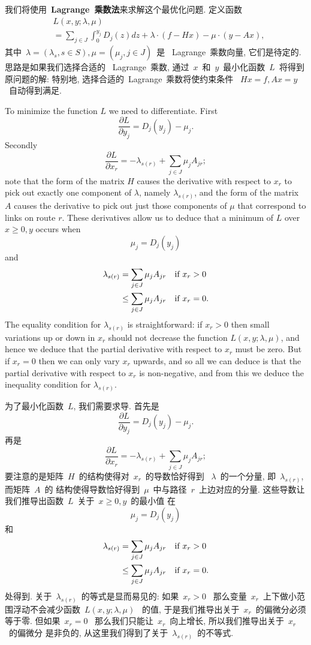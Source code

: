 \documentclass[a4paper,12pt, twocolumn]{article}
\begin{document}
我们将使用~\textbf{Lagrange~乘数法}来求解这个最优化问题. 
定义函数
\begin{align*}
&L(x ,y ;\lambda ,\mu )   \\
&=\sum_{j\in J}\int_0^{y_j} 
D_j (z)dz+\lambda \cdot (f-H x)-\mu \cdot (y -A x ),
\end{align*}
其中~$\lambda =(\lambda_s, s \in S), \mu =(\mu_j, j \in J)$~是
~Lagrange~乘数向量, 它们是待定的. 思路是如果我们选择合适的
~Lagrange~乘数, 通过~$x$~和~$y$~最小化函数~$L$~将得到
原问题的解: 特别地, 选择合适的~Lagrange~乘数将使约束条件
~$H x =f, A x =y$~自动得到满足.

To minimize the function $L$ we need to differentiate.
First 
$${\frac{\partial L}{\partial y_j}} = D _j (y_j) -\mu_j .$$
Secondly
$${\frac{\partial L}{\partial x_r}} = -\lambda_{s(r)} +\sum_{j\in J}
\mu_j A_{jr};$$
note that the form of the 
matrix $H$ causes the derivative with respect to $x_r$
to pick out exactly one component of $\lambda$, namely $\lambda_{s(r)}$,
and the form of the  matrix $A$ causes the derivative 
to pick out just those components of
$\mu$ that correspond to links on route $r$.  
These derivatives allow us to deduce that
a minimum of $L$ over $x \geq 0, y$ occurs when
$$\mu_j =D_j(y_j) $$
and
\begin{align*}
\lambda_{s(r)}&=\sum_{j\in J} \mu_j A_{jr} \quad \hbox{if $x_r >0$} \\
&\leq\sum_{j\in J} \mu_j A_{jr} \quad \hbox{if $x_r=0$}.
\end{align*}
The equality condition for $\lambda_{s(r)}$
is straightforward:  if $x_r >0$ 
then small variations up or down in $x_r$ should
not decrease the function $L(x ,y ;\lambda ,\mu)$, and hence 
we deduce that the
partial derivative with respect to $x_r$ must be zero.
But if  $x_r =0$ then we can only vary $x_r$ upwards, and so
all we can deduce is that the partial derivative with respect to $x_r$
is non-negative, and from this we deduce the inequality condition
for $\lambda_{s(r)}$.

为了最小化函数~$L$, 我们需要求导. 首先是
$${\frac{\partial L}{\partial y_j}} = D _j (y_j) -\mu_j .$$
再是
$${\frac{\partial L}{\partial x_r}} = -\lambda_{s(r)} +\sum_{j\in J}
\mu_j A_{jr};$$
要注意的是矩阵~$H$~的结构使得对~$x_{r}$~的导数恰好得到
~$\lambda$~的一个分量, 即~$\lambda_{s(r)}$, 而矩阵~$A$~的
结构使得导数恰好得到~$\mu$~中与路径~$r$~上边对应的分量. 
这些导数让我们推导出函数~$L$~关于~$x \geq 0, y$~的最小值
在
$$\mu_j =D_j(y_j) $$
和
\begin{align*}
\lambda_{s(r)}&=\sum_{j\in J} \mu_j A_{jr} \quad \hbox{if $x_r >0$} \\
&\leq\sum_{j\in J} \mu_j A_{jr} \quad \hbox{if $x_r=0$}.
\end{align*}
处得到. 关于~$\lambda_{s(r)}$~的等式是显而易见的: 如果~$x_r > 0$~
那么变量~$x_r$~上下做小范围浮动不会减少函数~$L(x ,y ;\lambda ,\mu)$~
的值, 于是我们推导出关于~$x_{r}$~的偏微分必须等于零. 但如果~$x_r = 0$~
那么我们只能让~$x_{r}$~向上增长, 所以我们推导出关于~$x_{r}$~的偏微分
是非负的, 从这里我们得到了关于~$\lambda_{s(r)}$~的不等式. 
\end{document}
